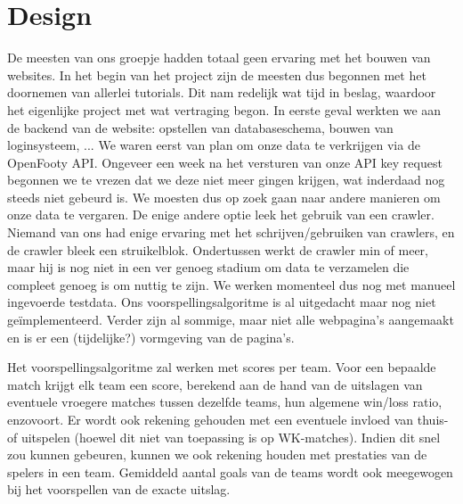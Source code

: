 \documentclass[11pt, a4paper]{article}
\begin{document}
\section{Design}
De meesten van ons groepje hadden totaal geen ervaring met het bouwen van websites. In het begin van het project zijn de meesten dus begonnen met het doornemen van allerlei tutorials. Dit nam redelijk wat tijd in beslag, waardoor het eigenlijke project met wat vertraging begon. In eerste geval werkten we aan de backend van de website: opstellen van databaseschema, bouwen van loginsysteem, ... We waren eerst van plan om onze data te verkrijgen via de OpenFooty API. Ongeveer een week na het versturen van onze API key request begonnen we te vrezen dat we deze niet meer gingen krijgen, wat inderdaad nog steeds niet gebeurd is. We moesten dus op zoek gaan naar andere manieren om onze data te vergaren. De enige andere optie leek het gebruik van een crawler. Niemand van ons had enige ervaring met het schrijven/gebruiken van crawlers, en de crawler bleek een struikelblok. Ondertussen werkt de crawler min of meer, maar hij is nog niet in een ver genoeg stadium om data te verzamelen die compleet genoeg is om nuttig te zijn. We werken momenteel dus nog met manueel ingevoerde testdata. Ons voorspellingsalgoritme is al uitgedacht maar nog niet geïmplementeerd. Verder zijn al sommige, maar niet alle webpagina's aangemaakt en is er een (tijdelijke?) vormgeving van de pagina's.

Het voorspellingsalgoritme zal werken met scores per team. Voor een bepaalde match krijgt elk team een score, berekend aan de hand van de uitslagen van eventuele vroegere matches tussen dezelfde teams, hun algemene win/loss ratio, enzovoort. Er wordt ook rekening gehouden met een eventuele invloed van thuis- of uitspelen (hoewel dit niet van toepassing is op WK-matches). Indien dit snel zou kunnen gebeuren, kunnen we ook rekening houden met prestaties van de spelers in een team. Gemiddeld aantal goals van de teams wordt ook meegewogen bij het voorspellen van de exacte uitslag.
\end{document}
